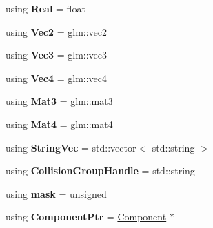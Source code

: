 \begin{DoxyCompactItemize}
\item 
\hypertarget{namespaceDCEngine_ac6036335e7433d3887d8dd39cbc860d8}{using {\bfseries Real} = float}\label{namespaceDCEngine_ac6036335e7433d3887d8dd39cbc860d8}

\item 
\hypertarget{namespaceDCEngine_a665a3eb8eea4d6bdb5c54133409aad29}{using {\bfseries Vec2} = glm\-::vec2}\label{namespaceDCEngine_a665a3eb8eea4d6bdb5c54133409aad29}

\item 
\hypertarget{namespaceDCEngine_a01daba425800ce769f7bed214ef1929d}{using {\bfseries Vec3} = glm\-::vec3}\label{namespaceDCEngine_a01daba425800ce769f7bed214ef1929d}

\item 
\hypertarget{namespaceDCEngine_a389870cef94af54de4029458caa4912e}{using {\bfseries Vec4} = glm\-::vec4}\label{namespaceDCEngine_a389870cef94af54de4029458caa4912e}

\item 
\hypertarget{namespaceDCEngine_a0a72bc192e4169d86998f6a22aaf8ed3}{using {\bfseries Mat3} = glm\-::mat3}\label{namespaceDCEngine_a0a72bc192e4169d86998f6a22aaf8ed3}

\item 
\hypertarget{namespaceDCEngine_abd3cf275160d58a148e29d8904293dbd}{using {\bfseries Mat4} = glm\-::mat4}\label{namespaceDCEngine_abd3cf275160d58a148e29d8904293dbd}

\item 
\hypertarget{namespaceDCEngine_af60a29cbc852ec7dd8bd3525d82bade6}{using {\bfseries String\-Vec} = std\-::vector$<$ std\-::string $>$}\label{namespaceDCEngine_af60a29cbc852ec7dd8bd3525d82bade6}

\item 
\hypertarget{namespaceDCEngine_a19390f41f7f1e455e196c07cfa9aa5c8}{using {\bfseries Collision\-Group\-Handle} = std\-::string}\label{namespaceDCEngine_a19390f41f7f1e455e196c07cfa9aa5c8}

\item 
\hypertarget{namespaceDCEngine_a368adc05af87f06e0df93cc805cda622}{using {\bfseries mask} = unsigned}\label{namespaceDCEngine_a368adc05af87f06e0df93cc805cda622}

\item 
\hypertarget{namespaceDCEngine_aab54ca02077851a2492239d81b873a54}{using {\bfseries Component\-Ptr} = \hyperlink{classDCEngine_1_1Component}{Component} $\ast$}\label{namespaceDCEngine_aab54ca02077851a2492239d81b873a54}


\end{DoxyCompactItemize}
